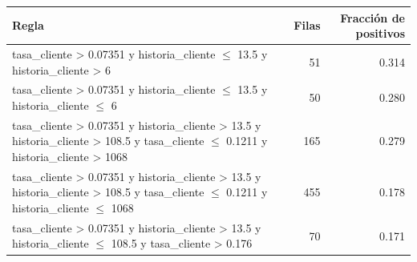 \begin{tabular}{lrr}
\toprule
Regla & Filas & Fracción de positivos \\
\midrule
tasa\_cliente > 0.07351 y historia\_cliente $\le$ 13.5 y historia\_cliente > 6 & 51 & 0.314 \\
tasa\_cliente > 0.07351 y historia\_cliente $\le$ 13.5 y historia\_cliente $\le$ 6 & 50 & 0.280 \\
tasa\_cliente > 0.07351 y historia\_cliente > 13.5 y historia\_cliente > 108.5 y tasa\_cliente $\le$ 0.1211 y historia\_cliente > 1068 & 165 & 0.279 \\
tasa\_cliente > 0.07351 y historia\_cliente > 13.5 y historia\_cliente > 108.5 y tasa\_cliente $\le$ 0.1211 y historia\_cliente $\le$ 1068 & 455 & 0.178 \\
tasa\_cliente > 0.07351 y historia\_cliente > 13.5 y historia\_cliente $\le$ 108.5 y tasa\_cliente > 0.176 & 70 & 0.171 \\
\bottomrule
\end{tabular}
